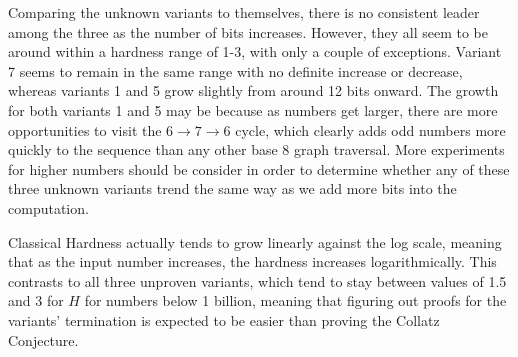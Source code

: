 Comparing the unknown variants to themselves, there is no consistent leader among the three as the number of bits increases. However, they all seem to be around within a hardness range of 1-3, with only a couple of exceptions. Variant 7 seems to remain in the same range with no definite increase or decrease, whereas variants 1 and 5 grow slightly from around 12 bits onward. The growth for both variants 1 and 5 may be because as numbers get larger, there are more opportunities to visit the $6 \rightarrow 7 \rightarrow 6$ cycle, which clearly adds odd numbers more quickly to the sequence than any other base 8 graph traversal. More experiments for higher numbers should be consider in order to determine whether any of these three unknown variants trend the same way as we add more bits into the computation.\par
Classical Hardness actually tends to grow linearly against the log scale, meaning that as the input number increases, the hardness increases logarithmically. This contrasts to all three unproven variants, which tend to stay between values of 1.5 and 3 for $H$ for numbers below 1 billion, meaning that figuring out proofs for the variants' termination is expected to be easier than proving the Collatz Conjecture.
